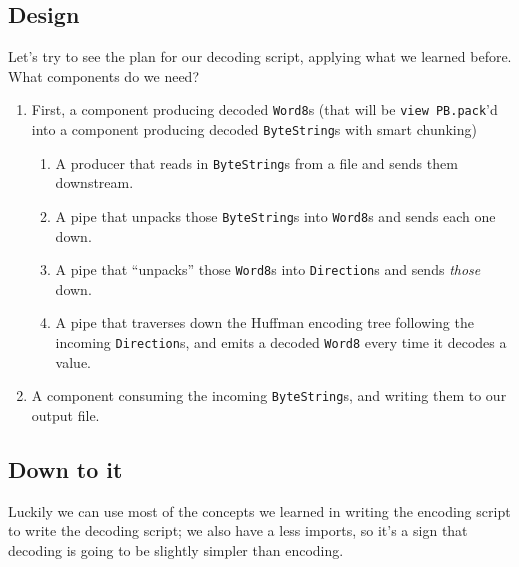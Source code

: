 \documentclass[]{article}
\begin{document}
\hypertarget{design-1}{%
\subsection{Design}\label{design-1}}

Let's try to see the plan for our decoding script, applying what we learned
before. What components do we need?

\begin{enumerate}
\def\labelenumi{\arabic{enumi}.}
\tightlist
\item
  First, a component producing decoded \texttt{Word8}s (that will be
  \texttt{view\ PB.pack}'d into a component producing decoded
  \texttt{ByteString}s with smart chunking)

  \begin{enumerate}
  \def\labelenumii{\arabic{enumii}.}
  \tightlist
  \item
    A producer that reads in \texttt{ByteString}s from a file and sends them
    downstream.
  \item
    A pipe that unpacks those \texttt{ByteString}s into \texttt{Word8}s and
    sends each one down.
  \item
    A pipe that ``unpacks'' those \texttt{Word8}s into \texttt{Direction}s and
    sends \emph{those} down.
  \item
    A pipe that traverses down the Huffman encoding tree following the incoming
    \texttt{Direction}s, and emits a decoded \texttt{Word8} every time it
    decodes a value.
  \end{enumerate}
\item
  A component consuming the incoming \texttt{ByteString}s, and writing them to
  our output file.
\end{enumerate}

\hypertarget{down-to-it-1}{%
\subsection{Down to it}\label{down-to-it-1}}

Luckily we can use most of the concepts we learned in writing the encoding
script to write the decoding script; we also have a less imports, so it's a sign
that decoding is going to be slightly simpler than encoding.
\end{document}
